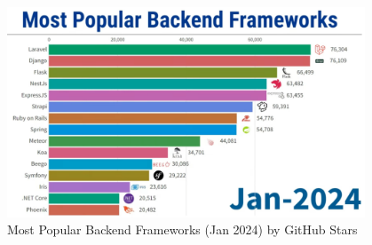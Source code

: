 \begin{figure}[htbp]
 \centering
 \includegraphics[width=0.95\textwidth]{gfx/figures/Popular_BE.png}
 \caption{Most Popular Backend Frameworks (Jan 2024) by GitHub Stars \cite{backend:popularity}}
 \label{fig:methodology:popularBE}
\end{figure}


